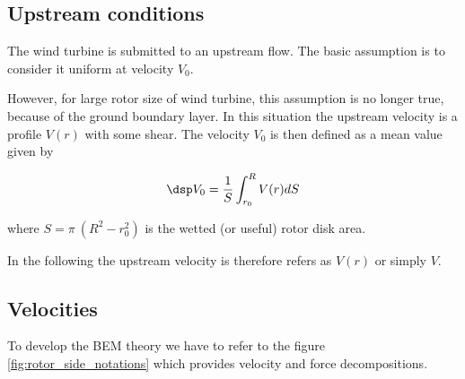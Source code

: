 % 



% 

% 

\subsection{Upstream conditions}

The wind turbine  is submitted to an upstream flow. The basic assumption is to consider it
uniform at velocity  $V_0$.

However, for large rotor size of wind turbine, this assumption is no longer true, because of the 
ground boundary layer. In this situation the upstream velocity is a profile $V(r)$ with some shear.
The velocity $V_0$ is then defined as a mean value given by 

$$ \dsp
V_0 = \frac{1}{S} \int_{r_0}^R V(r) dS
$$

where $S = \pi~ (R^2-r_0^2)$ is the wetted (or useful) rotor disk area.

In the following the upstream velocity is therefore refers as $V(r)$ or simply $V$.


\subsection{Velocities}

To develop the BEM theory we have to refer to the figure \ref{fig:rotor_side_notations} which provides
velocity and force decompositions.



